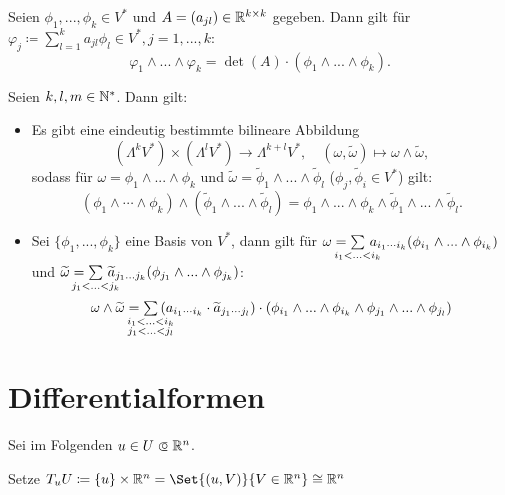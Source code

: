 \documentclass{cheat-sheet}
\theoremstyle{definition}
\begin{document}
\begin{samepage}

\begin{prop}
  Seien $\phi_1, ..., \phi_k \in V^*$ und $A = (a_{jl}) \in \mathbb{R}^{k \times k}$ gegeben.
  Dann gilt für $\varphi_j \coloneqq \sum_{l=1}^k a_{jl} \phi_l \in V^*, j = 1, ..., k$:
  \[ \varphi_1 \wedge ... \wedge \varphi_k = \det(A) \cdot (\phi_1 \wedge ... \wedge \phi_k). \]
\end{prop}

\begin{satz}
  Seien $k, l, m \in \mathbb{N}^*$. Dann gilt:
  \begin{itemize}
    \item Es gibt eine eindeutig bestimmte bilineare Abbildung
    \[ (\Lambda^k V^*) \times (\Lambda^l V^*) \to \Lambda^{k+l} V^*, \quad (\omega, \widetilde{\omega}) \mapsto \omega \wedge \widetilde{\omega}, \]
    sodass für $\omega = \phi_1 \wedge ... \wedge \phi_k$ und $\widetilde{\omega} = \widetilde{\phi}_1 \wedge ... \wedge \widetilde{\phi}_l$ ($\phi_j, \widetilde{\phi}_i \in V^*$) gilt:
    \[ (\phi_1 \wedge \cdots \wedge \phi_k) \wedge (\widetilde{\phi}_1 \wedge ... \wedge \widetilde{\phi}_l) = \phi_1 \wedge ... \wedge \phi_k \wedge \widetilde{\phi}_1 \wedge ... \wedge \widetilde{\phi}_l. \]
    \item Sei $\{ \phi_1 , ..., \phi_k \}$ eine Basis von $V^*$, dann gilt für $\omega = \sum_{\mathclap{i_1 < ... < i_k}} \, a_{i_1 \cdots i_k} (\phi_{i_1} \wedge ... \wedge \phi_{i_k})$ und $\widetilde{\omega} = \sum_{\mathclap{j_1 < ... < j_k}} \, \widetilde{a}_{j_1 ... j_k} (\phi_{j_1} \wedge ... \wedge \phi_{j_k})$:
    \[ \omega \wedge \widetilde{\omega} = \sum_{\mathclap{\substack{i_1 < ... < i_k \\ j_1 < ... < j_l}}} \, (a_{i_1 \cdots i_k} \cdot \widetilde{a}_{j_1 \cdots j_l}) \cdot (\phi_{i_1} \wedge ... \wedge \phi_{i_k} \wedge \phi_{j_1} \wedge ... \wedge \phi_{j_l}) \]
  \end{itemize}
\end{satz}

\section{Differentialformen}

\end{samepage}


\begin{nota}
  Sei im Folgenden $u \in U \opn \R^n$.

  Setze $T_u U \coloneqq \{ u \} \times \R^n = \Set{ (u, V) }{ V \in \R^n } \cong \R^n$
\end{nota}
\end{document}
